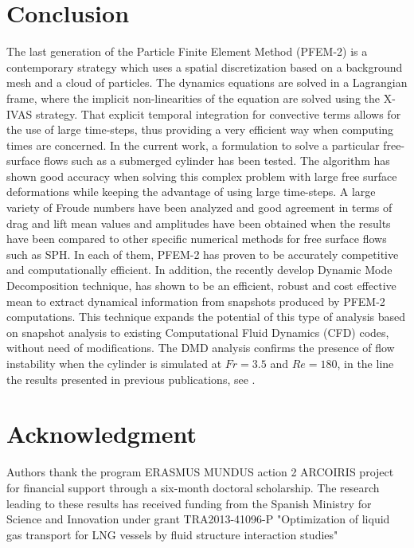 \documentclass[a4paper,conference]{IEEEtran}
\begin{document}



\section{Conclusion}
The last generation of the Particle Finite Element Method (PFEM-2) is a contemporary strategy which uses a spatial discretization based on a background mesh and a cloud of particles. The dynamics equations are solved in a Lagrangian frame, where the implicit non-linearities of the equation are solved using the X-IVAS strategy. That explicit temporal integration for convective terms allows for the use of large time-steps, thus providing a very efficient way when computing times are concerned.
In the current work, a formulation to solve a particular free-surface flows such as a submerged cylinder has been tested. The algorithm has shown good accuracy when solving this complex problem with large free surface deformations while keeping the advantage of using large time-steps. A large variety of Froude numbers have been analyzed and good agreement in terms of drag and lift mean values and amplitudes have been obtained when the results have been compared to other specific numerical methods for free surface flows such as SPH. In each of them, PFEM-2 has proven to be accurately competitive and computationally efficient.
In addition, the recently develop Dynamic Mode Decomposition technique, has shown to be an efficient, robust and cost effective mean to extract dynamical information from snapshots produced by PFEM-2 computations. This technique expands the potential of this type of analysis based on snapshot analysis to existing
Computational Fluid Dynamics (CFD) codes, without need of modifications. The DMD analysis confirms the presence of flow instability when the cylinder is simulated at $Fr=3.5$ and $Re=180$, in the line the results presented in previous publications, see \cite{Dimas89}.

\section*{Acknowledgment}
Authors thank the program ERASMUS MUNDUS action 2 ARCOIRIS project for financial support through a six-month doctoral scholarship. The research leading to these results has received funding from the Spanish Ministry for Science and Innovation under grant TRA2013-41096-P
"Optimization of liquid gas transport for LNG vessels by fluid structure interaction studies"



\end{document}
